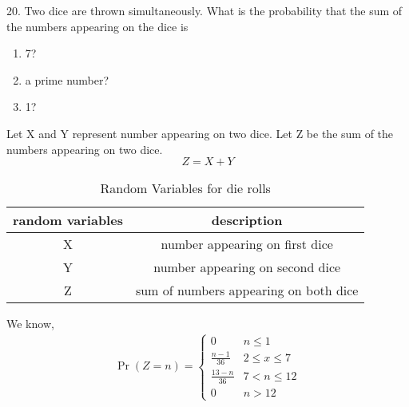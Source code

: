 \documentclass[]{article}
\begin{document}
\providecommand{\qfunc}[1]{\ensuremath{Q\left(#1\right)}}
\providecommand{\gauss}[2]{\mathcal{N}\ensuremath{\left(#1,#2\right)}}
\providecommand{\diff}[2]{\ensuremath{\frac{d{#1}}{d{#2}}}}
\providecommand{\myceil}[1]{\left \lceil #1 \right \rceil }
\newcommand\figref{Fig.~\ref}
\newcommand\tabref{Table~\ref}
\newcommand{\sinc}{\,\text{sinc}\,}
\newcommand{\rect}{\,\text{rect}\,}

\let\vec\mathbf

20. Two dice are thrown simultaneously. What is the probability that the sum of the numbers appearing on the dice is 
\begin{enumerate}
\item{7?}
\item{a prime number?}
\item{1?}
\end{enumerate}

\solution Let X and Y represent number appearing on two dice. Let Z be the sum of the numbers appearing on two dice.
$$Z=X+Y$$

\begin{table}[H]
\centering
\begin{tabular}{|c|c|}
\hline
random variables & description \\
\hline
X & number appearing on first dice \\
\hline
Y & number appearing on second dice \\
\hline
Z & sum of numbers appearing on both dice \\
\hline
\end{tabular}
\label{tab:ncert_exemplar/10/13/3/20}
\caption{Random Variables for die rolls}
\end{table}

 We know,
\begin{align}
\Pr(Z=n) = 
\begin{cases}
0 &  n \leq{1} \\
\frac{n-1}{36} &  2 \leq{x} \leq{7} \\
\frac{13-n}{36} &  7 < n \leq{12} \\
0 &  n>12
\label{eq:ncert_exemplar/10/13/3/20}
\end{cases}
\end{align}
\end{document}
